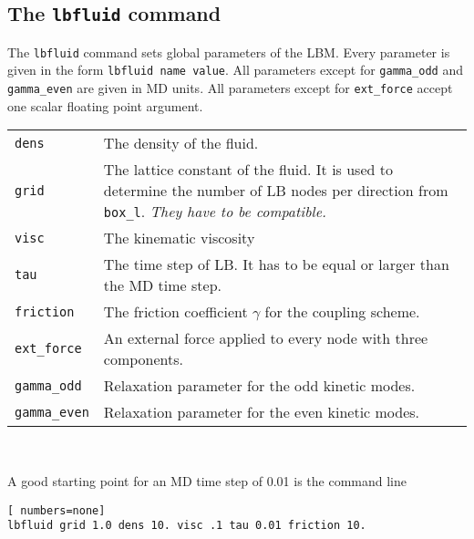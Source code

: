 \subsection*{The \lstinline|lbfluid| command}
The \lstinline{lbfluid} command sets global parameters of the LBM. Every
parameter is given in the form \lstinline|lbfluid name value|. 
All parameters except for \lstinline|gamma_odd| and  \lstinline|gamma_even|
are given in MD units. All parameters except for \lstinline|ext_force| accept
one scalar floating point argument. \\
\vspace{0,2cm}
\begin{tabular}{p{}p{}}
\lstinline|dens| & The density of the fluid.\\
\lstinline|grid| & The lattice constant of the fluid. It is used to determine the number of LB nodes 
per direction from \lstinline|box_l|. {\em They have to be compatible.} \\
\lstinline|visc| & The kinematic viscosity \\
\lstinline|tau| & The time step of LB. It has to be equal or larger than the MD time step. \\
\lstinline|friction| & The friction coefficient $\gamma$ for the coupling scheme. \\
\lstinline|ext_force| & An external force applied to every node with three components. \\
\lstinline|gamma_odd| & Relaxation parameter for the odd kinetic modes. \\
\lstinline|gamma_even| & Relaxation parameter for the even kinetic modes.
\end{tabular} \\
\vspace{0,2cm}

A good starting point for an MD time step of 0.01 is the command line
\vspace{0,2cm}
\begin{lstlisting}[ numbers=none]
lbfluid grid 1.0 dens 10. visc .1 tau 0.01 friction 10.
\end{lstlisting}
\vspace{0,2cm}

